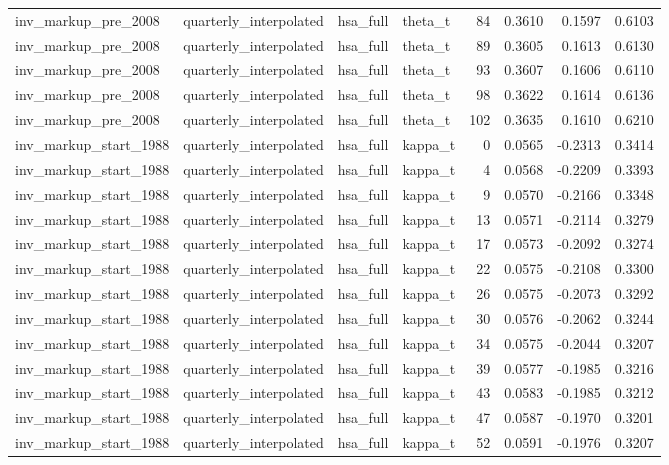 \begin{tabular}{llllrrrr}
inv\_markup\_pre\_2008 & quarterly\_interpolated & hsa\_full & theta\_t & 84 & 0.3610 & 0.1597 & 0.6103 \\
inv\_markup\_pre\_2008 & quarterly\_interpolated & hsa\_full & theta\_t & 89 & 0.3605 & 0.1613 & 0.6130 \\
inv\_markup\_pre\_2008 & quarterly\_interpolated & hsa\_full & theta\_t & 93 & 0.3607 & 0.1606 & 0.6110 \\
inv\_markup\_pre\_2008 & quarterly\_interpolated & hsa\_full & theta\_t & 98 & 0.3622 & 0.1614 & 0.6136 \\
inv\_markup\_pre\_2008 & quarterly\_interpolated & hsa\_full & theta\_t & 102 & 0.3635 & 0.1610 & 0.6210 \\
inv\_markup\_start\_1988 & quarterly\_interpolated & hsa\_full & kappa\_t & 0 & 0.0565 & -0.2313 & 0.3414 \\
inv\_markup\_start\_1988 & quarterly\_interpolated & hsa\_full & kappa\_t & 4 & 0.0568 & -0.2209 & 0.3393 \\
inv\_markup\_start\_1988 & quarterly\_interpolated & hsa\_full & kappa\_t & 9 & 0.0570 & -0.2166 & 0.3348 \\
inv\_markup\_start\_1988 & quarterly\_interpolated & hsa\_full & kappa\_t & 13 & 0.0571 & -0.2114 & 0.3279 \\
inv\_markup\_start\_1988 & quarterly\_interpolated & hsa\_full & kappa\_t & 17 & 0.0573 & -0.2092 & 0.3274 \\
inv\_markup\_start\_1988 & quarterly\_interpolated & hsa\_full & kappa\_t & 22 & 0.0575 & -0.2108 & 0.3300 \\
inv\_markup\_start\_1988 & quarterly\_interpolated & hsa\_full & kappa\_t & 26 & 0.0575 & -0.2073 & 0.3292 \\
inv\_markup\_start\_1988 & quarterly\_interpolated & hsa\_full & kappa\_t & 30 & 0.0576 & -0.2062 & 0.3244 \\
inv\_markup\_start\_1988 & quarterly\_interpolated & hsa\_full & kappa\_t & 34 & 0.0575 & -0.2044 & 0.3207 \\
inv\_markup\_start\_1988 & quarterly\_interpolated & hsa\_full & kappa\_t & 39 & 0.0577 & -0.1985 & 0.3216 \\
inv\_markup\_start\_1988 & quarterly\_interpolated & hsa\_full & kappa\_t & 43 & 0.0583 & -0.1985 & 0.3212 \\
inv\_markup\_start\_1988 & quarterly\_interpolated & hsa\_full & kappa\_t & 47 & 0.0587 & -0.1970 & 0.3201 \\
inv\_markup\_start\_1988 & quarterly\_interpolated & hsa\_full & kappa\_t & 52 & 0.0591 & -0.1976 & 0.3207 \\

\end{tabular}
